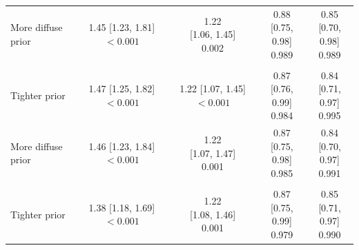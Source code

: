 \begin{tabular}[t]{lcccc}
\hspace{1em}More diffuse prior & \makecell[c]{1.45\\{[1.23, 1.81]}\\$<0.001$} & \makecell[c]{1.22\\{[1.06, 1.45]}\\0.002} & \makecell[c]{0.88\\{[0.75, 0.98]}\\0.989} & \makecell[c]{0.85\\{[0.70, 0.98]}\\0.989}\\
\addlinespace[0.3em]
\multicolumn{5}{l}{\textit{Idiosyncratic decision noise ($\sigma_u$)}}\\
\hspace{1em}Tighter prior & \makecell[c]{1.47\\{[1.25, 1.82]}\\$<0.001$} & \makecell[c]{1.22\\{[1.07, 1.45]}\\$<0.001$} & \makecell[c]{0.87\\{[0.76, 0.99]}\\0.984} & \makecell[c]{0.84\\{[0.71, 0.97]}\\0.995}\\
\hspace{1em}More diffuse prior & \makecell[c]{1.46\\{[1.23, 1.84]}\\$<0.001$} & \makecell[c]{1.22\\{[1.07, 1.47]}\\0.001} & \makecell[c]{0.87\\{[0.75, 0.98]}\\0.985} & \makecell[c]{0.84\\{[0.70, 0.97]}\\0.991}\\
\addlinespace[0.3em]
\multicolumn{5}{l}{\textit{Observability parameters}}\\
\hspace{1em}Tighter prior & \makecell[c]{1.38\\{[1.18, 1.69]}\\$<0.001$} & \makecell[c]{1.22\\{[1.08, 1.46]}\\0.001} & \makecell[c]{0.87\\{[0.75, 0.99]}\\0.979} & \makecell[c]{0.85\\{[0.71, 0.97]}\\0.990}\\

\end{tabular}
